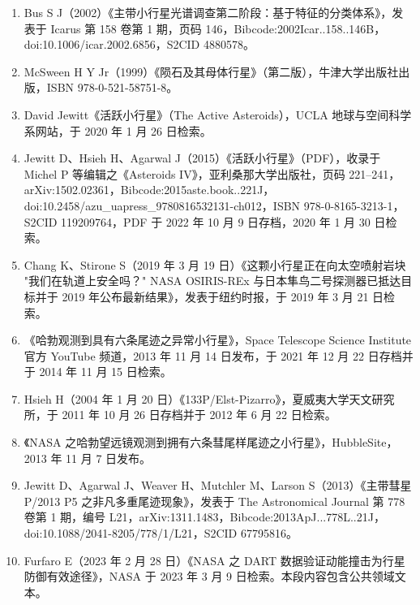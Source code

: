 \begin{enumerate}
\item Bus S J（2002）《主带小行星光谱调查第二阶段：基于特征的分类体系》，发表于 Icarus 第 158 卷第 1 期，页码 146，Bibcode:2002Icar..158..146B，doi:10.1006/icar.2002.6856，S2CID 4880578。
\item McSween H Y Jr（1999）《陨石及其母体行星》（第二版），牛津大学出版社出版，ISBN 978-0-521-58751-8。
\item David Jewitt《活跃小行星》（The Active Asteroids），UCLA 地球与空间科学系网站，于 2020 年 1 月 26 日检索。
\item Jewitt D、Hsieh H、Agarwal J（2015）《活跃小行星》（PDF），收录于 Michel P 等编辑之《Asteroids IV》，亚利桑那大学出版社，页码 221–241，arXiv:1502.02361，Bibcode:2015aste.book..221J，doi:10.2458/azu_uapress_9780816532131-ch012，ISBN 978-0-8165-3213-1，S2CID 119209764，PDF 于 2022 年 10 月 9 日存档，2020 年 1 月 30 日检索。
\item Chang K、Stirone S（2019 年 3 月 19 日）《这颗小行星正在向太空喷射岩块 "我们在轨道上安全吗？" NASA OSIRIS-REx 与日本隼鸟二号探测器已抵达目标并于 2019 年公布最新结果》，发表于纽约时报，于 2019 年 3 月 21 日检索。
\item 《哈勃观测到具有六条尾迹之异常小行星》，Space Telescope Science Institute 官方 YouTube 频道，2013 年 11 月 14 日发布，于 2021 年 12 月 22 日存档并于 2014 年 11 月 15 日检索。
\item Hsieh H（2004 年 1 月 20 日）《133P/Elst-Pizarro》，夏威夷大学天文研究所，于 2011 年 10 月 26 日存档并于 2012 年 6 月 22 日检索。
\item 《NASA 之哈勃望远镜观测到拥有六条彗尾样尾迹之小行星》，HubbleSite，2013 年 11 月 7 日发布。
\item Jewitt D、Agarwal J、Weaver H、Mutchler M、Larson S（2013）《主带彗星 P/2013 P5 之非凡多重尾迹现象》，发表于 The Astronomical Journal 第 778 卷第 1 期，编号 L21，arXiv:1311.1483，Bibcode:2013ApJ...778L..21J，doi:10.1088/2041-8205/778/1/L21，S2CID 67795816。
\item Furfaro E（2023 年 2 月 28 日）《NASA 之 DART 数据验证动能撞击为行星防御有效途径》，NASA 于 2023 年 3 月 9 日检索。本段内容包含公共领域文本。

\end{enumerate}
